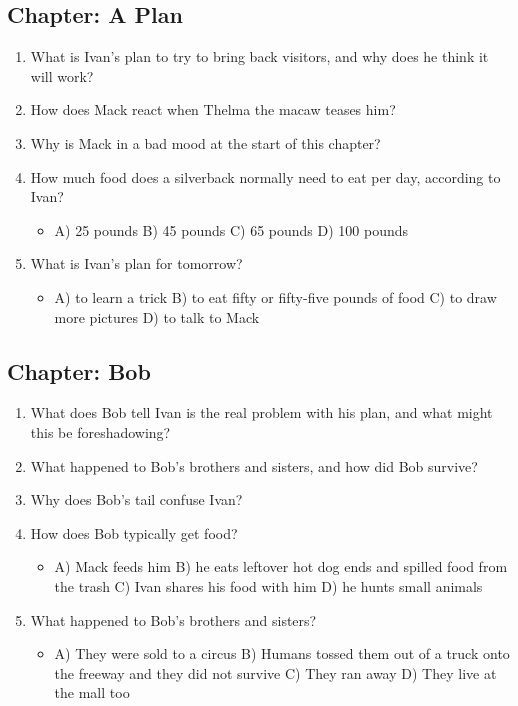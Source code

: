 \documentclass[11pt]{article}
\begin{document}
\subsection*{Chapter: A Plan}
\begin{enumerate}
  \item What is Ivan's plan to try to bring back visitors, and why does he think it will work?
  \vspace{0.5in}
  \item How does Mack react when Thelma the macaw teases him?
  \vspace{0.5in}
  \item Why is Mack in a bad mood at the start of this chapter?
  \vspace{0.5in}
  \item How much food does a silverback normally need to eat per day, according to Ivan?
  \begin{itemize}\setlength\itemsep{0pt}
    \item[] A) 25 pounds \quad B) 45 pounds \quad C) 65 pounds \quad D) 100 pounds
  \end{itemize}
  \item What is Ivan's plan for tomorrow?
  \begin{itemize}\setlength\itemsep{0pt}
    \item[] A) to learn a trick \quad B) to eat fifty or fifty-five pounds of food \quad C) to draw more pictures \quad D) to talk to Mack
  \end{itemize}
\end{enumerate}

\subsection*{Chapter: Bob}
\begin{enumerate}
  \item What does Bob tell Ivan is the real problem with his plan, and what might this be foreshadowing?
  \vspace{0.5in}
  \item What happened to Bob's brothers and sisters, and how did Bob survive?
  \vspace{0.5in}
  \item Why does Bob's tail confuse Ivan?
  \vspace{0.5in}
  \item How does Bob typically get food?
  \begin{itemize}\setlength\itemsep{0pt}
    \item[] A) Mack feeds him \quad B) he eats leftover hot dog ends and spilled food from the trash \quad C) Ivan shares his food with him \quad D) he hunts small animals
  \end{itemize}
  \item What happened to Bob's brothers and sisters?
  \begin{itemize}\setlength\itemsep{0pt}
    \item[] A) They were sold to a circus \quad B) Humans tossed them out of a truck onto the freeway and they did not survive \quad C) They ran away \quad D) They live at the mall too
  \end{itemize}
\end{enumerate}
\end{document}
